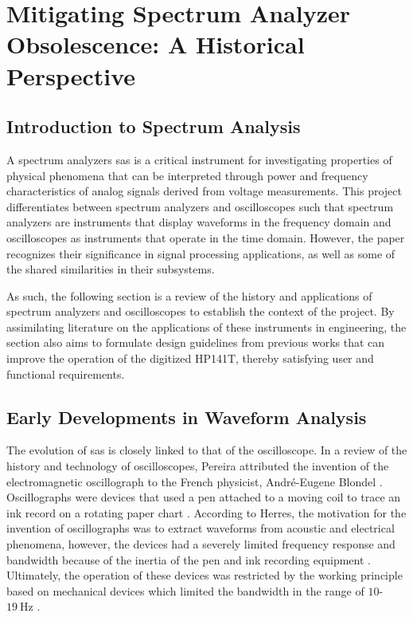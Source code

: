 \documentclass[class=report,11pt,crop=false]{standalone}
\begin{document}
\section{Mitigating Spectrum Analyzer Obsolescence: A Historical Perspective}

\subsection{Introduction to Spectrum Analysis}

A spectrum analyzers \acrshort{sa}s is a critical instrument for investigating properties of physical phenomena that can be interpreted through power and frequency characteristics of analog signals derived from voltage measurements. This project differentiates between spectrum analyzers and oscilloscopes such that spectrum analyzers are instruments that display waveforms in the frequency domain and oscilloscopes as instruments that operate in the time domain. However, the paper recognizes their significance in signal processing applications, as well as some of the shared similarities in their subsystems. 

As such, the following section is a review of the history and applications of spectrum analyzers and oscilloscopes to establish the context of the project. By assimilating literature on the applications of these instruments in engineering, the section also aims to formulate design guidelines from previous works that can improve the operation of the digitized HP141T, thereby satisfying user and functional requirements. 

\subsection{Early Developments in Waveform Analysis}

The evolution of \acrshort{sa}s is closely linked to that of the oscilloscope. In a review of the history and technology of oscilloscopes, Pereira attributed the invention of the electromagnetic oscillograph to the French physicist, Andr\'{e}-Eugene Blondel \cite{pereira2006}. Oscillographs were devices that used a pen attached to a moving coil to trace an ink record on a rotating paper chart \cite{pereira2006}. According to Herres, the motivation for the invention of oscillographs was to extract waveforms from acoustic and electrical phenomena, however, the devices had a severely limited frequency response and bandwidth because of the inertia of the pen and ink recording equipment \cite{herres2020}. Ultimately, the operation of these devices was restricted by the working principle based on mechanical devices which limited the bandwidth in the range of $10$-$\SI{19}{\hertz}$ \cite{pereira2006}.
\end{document}

